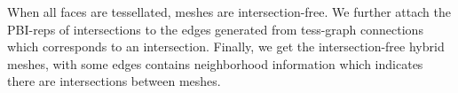 \documentclass[10pt,journal,compsoc]{IEEEtran}
\begin{document}
When all faces are tessellated, meshes are intersection-free. We further attach the PBI-reps of intersections to the edges generated from tess-graph connections which corresponds to an intersection. Finally, we get the intersection-free hybrid meshes, with some edges contains neighborhood information which indicates there are intersections between meshes.



\end{document}
